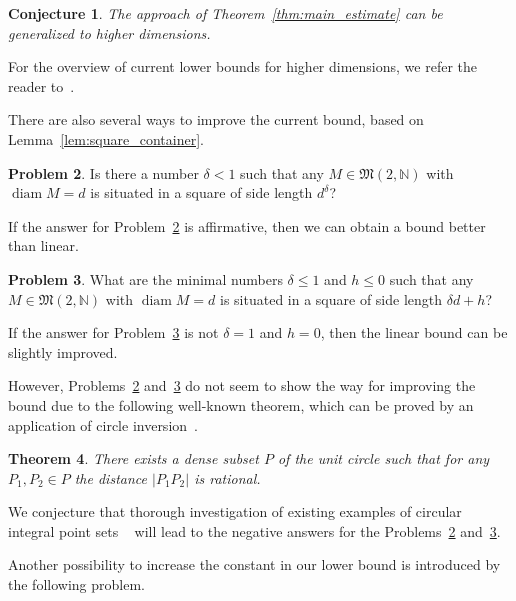 \documentclass[a4paper,14pt]{article} %
\theoremstyle{plain}
\newtheorem{theorem}{Theorem}[section]
\newtheorem{conjecture}[theorem]{Conjecture}
\theoremstyle{definition}
\newtheorem{problem}[theorem]{Problem}
\begin{document}
\begin{conjecture}
	The approach of Theorem~\ref{thm:main_estimate} can be generalized to higher dimensions.
\end{conjecture}
For the overview of current lower bounds for higher dimensions, we refer the reader to~\cite{nozaki2013lower}.

There are also several ways to improve the current bound,
based on Lemma~\ref{lem:square_container}.

\begin{problem}
	\label{prb:square_side_length_and_diameter_power}
	Is there a number $\delta < 1$ such that any $M\in\mathfrak{M}(2,\mathbb{N})$ with $\operatorname{diam} M = d$
	is situated in a square of side length $d^\delta$?
\end{problem}
If the answer for Problem~\ref{prb:square_side_length_and_diameter_power} is affirmative,
then we can obtain a bound better than linear.

\begin{problem}
	\label{prb:square_side_length_and_diameter_linear}
	What are the minimal numbers $\delta \leq 1$ and $h \leq 0$
	such that any $M\in\mathfrak{M}(2,\mathbb{N})$ with $\operatorname{diam} M = d$
	is situated in a square of side length $\delta d + h$?
\end{problem}

If the answer for Problem~\ref{prb:square_side_length_and_diameter_linear} is not $\delta = 1$ and $h = 0$,
then the linear bound can be slightly improved.

However, Problems~\ref{prb:square_side_length_and_diameter_power} and~\ref{prb:square_side_length_and_diameter_linear}
do not seem to show the way for improving the bound
due to the following well-known theorem,
which can be proved by an application of circle inversion~\cite{solymosi2010question}.
\begin{theorem}
	\label{thm:rational_set_on_circle}
	There exists a dense subset $P$ of the unit circle such that for any $P_1, P_2 \in P$
	the distance $|P_1 P_2|$ is rational.
\end{theorem}
We conjecture that thorough investigation of existing examples of circular integral point sets
~\cite{bat2018number,harborth1993upper,piepmeyer1996maximum}
will lead to the negative answers for the
Problems~\ref{prb:square_side_length_and_diameter_power} and~\ref{prb:square_side_length_and_diameter_linear}.

Another possibility to increase the constant in our lower bound is introduced by the following problem.
\end{document}
